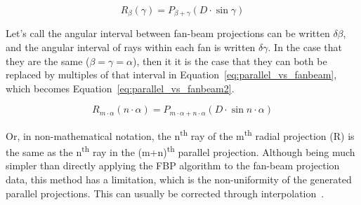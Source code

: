 \begin{equation}
    \label{eq:parallel_vs_fanbeam}
    R_{\beta}(\gamma) = P_{\beta + \gamma}(D \cdot \sin \gamma)
\end{equation}

Let's call the angular interval between fan-beam projections can be
written $\delta\beta$, and the angular interval of rays within each fan
is written $\delta\gamma$. In the case that they are the same
($\beta=\gamma=\alpha$), then it it is the case that they can both be
replaced by multiples of that interval in
Equation~\ref{eq:parallel_vs_fanbeam}, which becomes
Equation~\ref{eq:parallel_vs_fanbeam2}.

\begin{equation}
    \label{eq:parallel_vs_fanbeam2}
    R_{m \cdot \alpha}(n \cdot\alpha) = P_{m \cdot\alpha + n
    \cdot\alpha}(D \cdot \sin n \cdot\alpha)
\end{equation}

Or, in non-mathematical notation, the n\textsuperscript{th} ray of the
m\textsuperscript{th} radial projection (R) is the same as the
n\textsuperscript{th} ray in the (m+n)\textsuperscript{th} parallel
projection. Although being much simpler than directly applying the
\gls{FBP} algorithm to the fan-beam projection data, this method has a
limitation, which is the non-uniformity of the generated parallel
projections. This can usually be corrected through
interpolation~\cite{Kak2001a}. 
